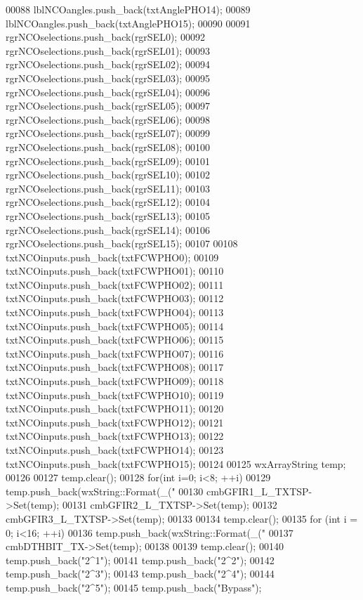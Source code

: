 \begin{DoxyCode}
00088     lblNCOangles.push\_back(txtAnglePHO14);
00089     lblNCOangles.push\_back(txtAnglePHO15);
00090 
00091     rgrNCOselections.push\_back(rgrSEL0);
00092     rgrNCOselections.push\_back(rgrSEL01);
00093     rgrNCOselections.push\_back(rgrSEL02);
00094     rgrNCOselections.push\_back(rgrSEL03);
00095     rgrNCOselections.push\_back(rgrSEL04);
00096     rgrNCOselections.push\_back(rgrSEL05);
00097     rgrNCOselections.push\_back(rgrSEL06);
00098     rgrNCOselections.push\_back(rgrSEL07);
00099     rgrNCOselections.push\_back(rgrSEL08);
00100     rgrNCOselections.push\_back(rgrSEL09);
00101     rgrNCOselections.push\_back(rgrSEL10);
00102     rgrNCOselections.push\_back(rgrSEL11);
00103     rgrNCOselections.push\_back(rgrSEL12);
00104     rgrNCOselections.push\_back(rgrSEL13);
00105     rgrNCOselections.push\_back(rgrSEL14);
00106     rgrNCOselections.push\_back(rgrSEL15);
00107 
00108     txtNCOinputs.push\_back(txtFCWPHO0);
00109     txtNCOinputs.push\_back(txtFCWPHO01);
00110     txtNCOinputs.push\_back(txtFCWPHO02);
00111     txtNCOinputs.push\_back(txtFCWPHO03);
00112     txtNCOinputs.push\_back(txtFCWPHO04);
00113     txtNCOinputs.push\_back(txtFCWPHO05);
00114     txtNCOinputs.push\_back(txtFCWPHO06);
00115     txtNCOinputs.push\_back(txtFCWPHO07);
00116     txtNCOinputs.push\_back(txtFCWPHO08);
00117     txtNCOinputs.push\_back(txtFCWPHO09);
00118     txtNCOinputs.push\_back(txtFCWPHO10);
00119     txtNCOinputs.push\_back(txtFCWPHO11);
00120     txtNCOinputs.push\_back(txtFCWPHO12);
00121     txtNCOinputs.push\_back(txtFCWPHO13);
00122     txtNCOinputs.push\_back(txtFCWPHO14);
00123     txtNCOinputs.push\_back(txtFCWPHO15);
00124 
00125     wxArrayString temp;
00126 
00127     temp.clear();
00128     \textcolor{keywordflow}{for}(\textcolor{keywordtype}{int} i=0; i<8; ++i)
00129         temp.push\_back(wxString::Format(\_(\textcolor{stringliteral}{"%
00130     cmbGFIR1_L_TXTSP->Set(temp);
00131     cmbGFIR2_L_TXTSP->Set(temp);
00132     cmbGFIR3_L_TXTSP->Set(temp);
00133 
00134     temp.clear();
00135     \textcolor{keywordflow}{for} (\textcolor{keywordtype}{int} i = 0; i<16; ++i)
00136         temp.push\_back(wxString::Format(\_(\textcolor{stringliteral}{"%
00137     cmbDTHBIT_TX->Set(temp);
00138 
00139     temp.clear();
00140     temp.push\_back(\textcolor{stringliteral}{"2^1"});
00141     temp.push\_back(\textcolor{stringliteral}{"2^2"});
00142     temp.push\_back(\textcolor{stringliteral}{"2^3"});
00143     temp.push\_back(\textcolor{stringliteral}{"2^4"});
00144     temp.push\_back(\textcolor{stringliteral}{"2^5"});
00145     temp.push\_back(\textcolor{stringliteral}{"Bypass"});
}}
\end{DoxyCode}
